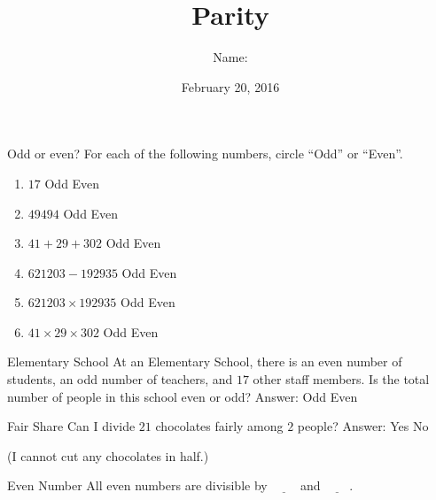 \documentclass[12pt,letterpaper]{article}
\title{Parity}
\author{Name: \underline{\hspace{5cm}}}
\date{February 20, 2016}
\begin{document}
\maketitle

\thispagestyle{empty}

\begin{problem}{Odd or even?}
For each of the following numbers, circle ``Odd'' or ``Even''.
\begin{enumerate}
 \item $17$ \hfill Odd \hspace{1em} Even
 \item $49494$ \hfill Odd \hspace{1em} Even
 \item $41 + 29 + 302$ \hfill Odd \hspace{1em} Even
 \item $621203 - 192935$ \hfill Odd \hspace{1em} Even
 \item $621203 \times 192935$ \hfill Odd \hspace{1em} Even
 \item $41 \times 29 \times 302$ \hfill Odd \hspace{1em} Even
\end{enumerate}
\end{problem}

\begin{problem}{Elementary School}
 At an Elementary School, there is an even number of students, an odd number of
 teachers, and $17$ other staff members. Is the total number of people in this
 school even or odd?
 \hfill Answer: Odd \hspace{1em} Even
\end{problem}

\begin{problem}{Fair Share}
 Can I divide $21$ chocolates fairly among $2$ people?
 \hfill Answer: Yes \hspace{1em} No

 (I cannot cut any chocolates in half.)
\end{problem}

\begin{problem}{Even Number}
 All even numbers are divisible by $\underline{\hspace{2em}}$ and
 $\underline{\hspace{2em}}$.
\end{problem}
\end{document}

